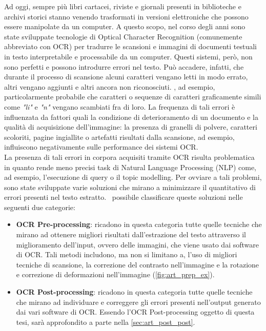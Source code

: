 \label{sec:arte_intro}
Ad oggi, sempre più libri cartacei, riviste e giornali presenti in biblioteche e archivi storici stanno venendo trasformati in versioni elettroniche che possono essere manipolate da un computer. A questo scopo, nel corso degli anni sono state sviluppate tecnologie di Optical Character Recognition (comunemente abbreviato con OCR) per tradurre le scansioni e immagini di documenti testuali in testo interpretabile e processabile da un computer. Questi sistemi, però, non sono perfetti e possono introdurre errori nel testo. Può accadere, infatti, che durante il processo di scansione alcuni caratteri vengano letti in modo errato, altri vengano aggiunti e altri ancora non riconosciuti. \E, ad esempio, particolarmente probabile che caratteri o sequenze di caratteri graficamente simili come \textit{"li"} e \textit{"n"} vengano scambiati fra di loro\cite{ocr_error_analysis}. La frequenza di tali errori è influenzata da fattori quali la condizione di deterioramento di un documento e la qualità di acquisizione dell'immagine\cite{hartley1999quality}: la presenza di granelli di polvere, caratteri scoloriti, pagine ingiallite o artefatti risultati dalla scansione, ad esempio, influiscono negativamente sulle performance dei sistemi OCR.\\
La presenza di tali errori in corpora acquisiti tramite OCR risulta problematica in quanto rende meno precisi task di Natural Language Processing (NLP) come, ad esempio, l'esecuzione di query \cite{impatto_ocr_1} o il topic modelling\cite{impatto_ocr_2}. Per ovviare a tali problemi, sono state sviluppate varie soluzioni che mirano a minimizzare il quantitativo di errori presenti nel testo estratto. \E\ possibile classificare queste soluzioni nelle seguenti due categorie:
\begin{itemize}
\item \textbf{OCR Pre-processing}: ricadono in questa categoria tutte quelle tecniche che mirano ad ottenere migliori risultati dall'estrazione del testo attraverso il miglioramento dell'input, ovvero delle immagini, che viene usato dai software di OCR. Tali metodi includono, ma non si limitano a, l'uso di migliori tecniche di scansione, la correzione del contrasto nell'immagine\cite{holley2009good} e la rotazione e correzione di deformazioni nell'immagine\cite{bieniecki2007image} (\autoref{fig:art_prep_ex}).

 
\item \textbf{OCR Post-processing}: ricadono in questa categoria tutte quelle tecniche che mirano ad individuare e correggere gli errori presenti nell'output generato dai vari software di OCR. Essendo l'OCR Post-processing oggetto di questa tesi, sarà approfondito a parte nella \autoref{sec:art_post_post}.
\end{itemize}

